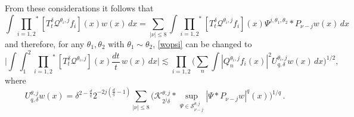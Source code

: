 \documentclass[11pt]{amsart}
\theoremstyle{definition}
\numberwithin{theorem}{section}
\numberwithin{definition}{section}
\def\prodstar{{\prod_{i=1,2}}^{\!\!*}}
\newcommand{\Be}{\begin{equation}}
\newcommand{\Ee}{\end{equation}}
\newcommand{\note}[1]{\footnote{\texttt{\Small #1}}}
\def\lc{\lesssim}
\def\cK{{\mathcal {K}}}
\def\cQ{{\mathcal {Q}}}
\def\cS{{\mathcal {S}}}
\begin{document}
From these considerations it follows that
$$\int \prodstar[T^\delta_t \cQ^{\theta_i,j}f_i](x)
w(x)\,dx
=\sum_{|\nu|\le 8} \int \prodstar[T^\delta_t \cQ^{\theta_i,j}f_i](x)
\Psi^{j,\theta_1,\theta_2}\!*
P_{\nu-j}w(x) \,dx$$
and therefore, for any  $\theta_1, \theta_2$ with $\theta_1\sim\theta_2$,
 \eqref{wopsi} can be changed to
\Be\label{wopsimod}
\Big|\int\int_1^2\prodstar [T^\delta_t \cQ^{\theta_i,j} ](x)  \frac{dt}{t}\,
w(x)\,dx\Big|
\lc
\prod_{i=1,2} \Big(\sum_n\int |Q^{\theta_i,j}_nf_i(x)|^2
U_{q,\delta}^{\theta_i,j} w(x)
\,dx\Big)^{1/2},
\Ee
where
$$U_{q,\delta}^{\theta,j  } w(x)=
\delta^{2-\frac{d}{q}}2^{-2j(\frac dq-1)}
\sum_{|\nu|\le 8}\big(\cK^{\theta,j}_{2^j\delta}*
\sup_{\Psi\in \cS^{\theta,j}_{\nu-j}}|\Psi*P_{\nu-j}w|^q(x)\big)^{1/q}\,.$$
\end{document}
